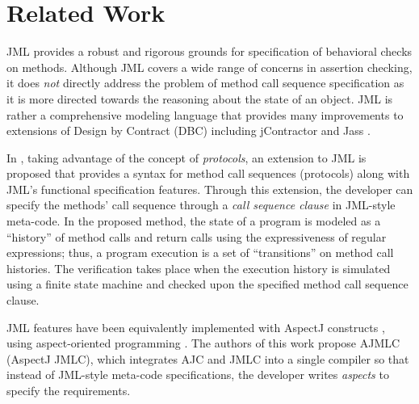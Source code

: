 
\section{Related Work} \label{ch05:sec:relworks}

JML \cite{leavens_baker_ruby_jml_design} provides a robust and rigorous grounds for specification of behavioral checks on methods. 
Although JML covers a wide range of concerns in assertion checking, it does \textit{not} directly address the problem of method call sequence specification  as it is more directed towards the reasoning about the state of an object. 
JML is rather a comprehensive modeling language that provides many improvements to extensions of Design by Contract (DBC) \cite{dbc} including jContractor \cite{jcontractor} and Jass \cite{jass}.

In \cite{yoonsik_ash_mscs}, taking advantage of the concept of
\textit{protocols}, an extension to JML is proposed that provides a syntax for
method call sequences (protocols) along with JML's functional specification
features. Through this extension, the developer can specify the methods' call
sequence through a \textsl{call sequence clause} in JML-style meta-code. In the
proposed method, the state of a program is modeled as a ``history'' of method
calls and return calls using the expressiveness of regular expressions; thus, a
program execution is a set of ``transitions'' on method call histories. The
verification takes place when the execution history is simulated using a finite
state machine and checked upon the specified method call sequence clause.

JML features have been equivalently implemented with AspectJ constructs
\cite{jml_aspects}, using aspect-oriented programming \cite{kiczales_aspectj}.
The authors of this work propose AJMLC (AspectJ JMLC), which integrates AJC and JMLC into a single compiler
so that instead of JML-style meta-code specifications, the developer writes 
\textsl{aspects} to specify the requirements. 

